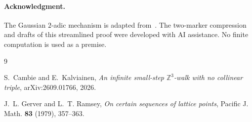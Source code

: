 \documentclass[10pt,reqno]{amsart}
\newcommand{\Z}{\mathbb Z}
\begin{document}
\paragraph{Acknowledgment.}
The Gaussian $2$-adic mechanism is adapted from~\cite{CK}.  The two-marker
compression and drafts of this streamlined proof were developed with AI
assistance.  No finite computation is used as a premise.

\begin{thebibliography}{9}

S.~Cambie and E.~Kalviainen,
\emph{An infinite small-step $\Z^3$-walk with no collinear triple},
arXiv:2609.01766, 2026.

J.~L. Gerver and L.~T. Ramsey,
\emph{On certain sequences of lattice points},
Pacific J. Math. \textbf{83} (1979), 357--363.

\end{thebibliography}
\end{document}
